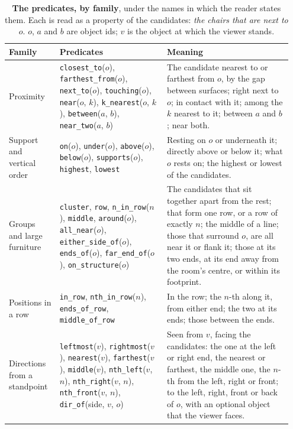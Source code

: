 \begin{table}[t]
\centering
\small
\caption{\textbf{The predicates, by family}, under the names in which the reader states them. Each is read as a property of the candidates: \emph{the chairs that are next to $o$}. $o$, $a$ and $b$ are object ids; $v$ is the object at which the viewer stands.}
\label{tab:supp_vocab}
\begin{tabular}{@{}p{0.17\linewidth}p{0.36\linewidth}p{0.42\linewidth}@{}}
\toprule
Family & Predicates & Meaning \\
\midrule
Proximity & \texttt{closest\_to}($o$), \texttt{farthest\_from}($o$), \texttt{next\_to}($o$), \texttt{touching}($o$), \texttt{near}($o$, $k$), \texttt{k\_nearest}($o$, $k$), \texttt{between}($a$, $b$), \texttt{near\_two}($a$, $b$) & The candidate nearest to or farthest from $o$, by the gap between surfaces; right next to $o$; in contact with it; among the $k$ nearest to it; between $a$ and $b$; near both. \\
\addlinespace
Support and vertical order & \texttt{on}($o$), \texttt{under}($o$), \texttt{above}($o$), \texttt{below}($o$), \texttt{supports}($o$), \texttt{highest}, \texttt{lowest} & Resting on $o$ or underneath it; directly above or below it; what $o$ rests on; the highest or lowest of the candidates. \\
\addlinespace
Groups and large furniture & \texttt{cluster}, \texttt{row}, \texttt{n\_in\_row}($n$), \texttt{middle}, \texttt{around}($o$), \texttt{all\_near}($o$), \texttt{either\_side\_of}($o$), \texttt{ends\_of}($o$), \texttt{far\_end\_of}($o$), \texttt{on\_structure}($o$) & The candidates that sit together apart from the rest; that form one row, or a row of exactly $n$; the middle of a line; those that surround $o$, are all near it or flank it; those at its two ends, at its end away from the room's centre, or within its footprint. \\
\addlinespace
Positions in a row & \texttt{in\_row}, \texttt{nth\_in\_row}($n$), \texttt{ends\_of\_row}, \texttt{middle\_of\_row} & In the row; the $n$-th along it, from either end; the two at its ends; those between the ends. \\
\addlinespace
Directions from a standpoint & \texttt{leftmost}($v$), \texttt{rightmost}($v$), \texttt{nearest}($v$), \texttt{farthest}($v$), \texttt{middle}($v$), \texttt{nth\_left}($v$, $n$), \texttt{nth\_right}($v$, $n$), \texttt{nth\_front}($v$, $n$), \texttt{dir\_of}(side, $v$, $o$) & Seen from $v$, facing the candidates: the one at the left or right end, the nearest or farthest, the middle one, the $n$-th from the left, right or front; to the left, right, front or back of $o$, with an optional object that the viewer faces. \\

\end{tabular}
\end{table}
